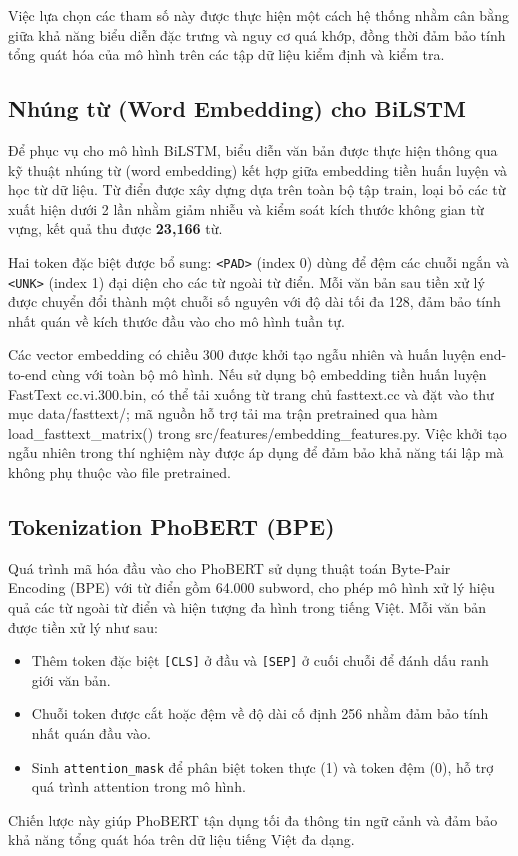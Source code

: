 \documentclass[12pt, a4paper]{report}
\newcommand{\bilstmVocab}{23,166}
\newcommand{\bilstmEmbDim}{300}
\newcommand{\bilstmMaxSeq}{128}
\newcommand{\phobertMaxSeq}{256}        %
\begin{document}
Việc lựa chọn các tham số này được thực hiện một cách hệ thống nhằm cân
bằng giữa khả năng biểu diễn đặc trưng và nguy cơ quá khớp, đồng thời
đảm bảo tính tổng quát hóa của mô hình trên các tập dữ liệu kiểm định
và kiểm tra.

\subsection{Nhúng từ (Word Embedding) cho BiLSTM}

Để phục vụ cho mô hình BiLSTM, biểu diễn văn bản được thực hiện thông qua kỹ thuật nhúng từ (word embedding) kết hợp giữa embedding tiền huấn luyện và học từ dữ liệu. Từ điển được xây dựng dựa trên toàn bộ tập train, loại bỏ các từ xuất hiện dưới 2 lần nhằm giảm nhiễu và kiểm soát kích thước không gian từ vựng, kết quả thu được \textbf{\bilstmVocab{}} từ.

Hai token đặc biệt được bổ sung: \texttt{<PAD>} (index 0) dùng để đệm các chuỗi ngắn và \texttt{<UNK>} (index 1) đại diện cho các từ ngoài từ điển. Mỗi văn bản sau tiền xử lý được chuyển đổi thành một chuỗi số nguyên với độ dài tối đa \bilstmMaxSeq, đảm bảo tính nhất quán về kích thước đầu vào cho mô hình tuần tự.

Các vector embedding có chiều \bilstmEmbDim{} được khởi tạo ngẫu nhiên và huấn luyện end-to-end cùng với toàn bộ mô hình. Nếu sử dụng bộ embedding tiền huấn luyện FastText cc.vi.300.bin, có thể tải xuống từ trang chủ fasttext.cc và đặt vào thư mục data/fasttext/; mã nguồn hỗ trợ tải ma trận pretrained qua hàm load\_fasttext\_matrix() trong src/features/embedding\_features.py. Việc khởi tạo ngẫu nhiên trong thí nghiệm này được áp dụng để đảm bảo khả năng tái lập mà không phụ thuộc vào file pretrained.



\subsection{Tokenization PhoBERT (BPE)}

Quá trình mã hóa đầu vào cho PhoBERT sử dụng thuật toán Byte-Pair Encoding (BPE) với từ điển gồm 64.000 subword, cho phép mô hình xử lý hiệu quả các từ ngoài từ điển và hiện tượng đa hình trong tiếng Việt. Mỗi văn bản được tiền xử lý như sau:
\begin{itemize}[leftmargin=2em]
  \item Thêm token đặc biệt \texttt{[CLS]} ở đầu và \texttt{[SEP]} ở cuối chuỗi để đánh dấu ranh giới văn bản.
  \item Chuỗi token được cắt hoặc đệm về độ dài cố định \phobertMaxSeq{} nhằm đảm bảo tính nhất quán đầu vào.
  \item Sinh \texttt{attention\_mask} để phân biệt token thực (1) và token đệm (0), hỗ trợ quá trình attention trong mô hình.
\end{itemize}
Chiến lược này giúp PhoBERT tận dụng tối đa thông tin ngữ cảnh và đảm bảo khả năng tổng quát hóa trên dữ liệu tiếng Việt đa dạng.
\end{document}
